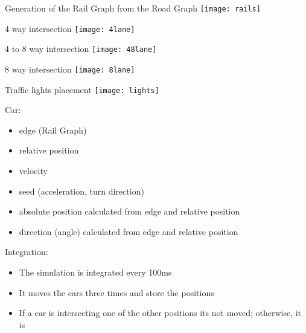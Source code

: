 \documentclass{beamer}
\begin{document}
\begin{frame}
	\begin{center}
	Generation of the Rail Graph from the Road Graph	
	\texttt{[image: rails]}
	\end{center}
\end{frame}

\begin{frame}
	\begin{center}
	4 way intersection	
	\texttt{[image: 4lane]}
	\end{center}
\end{frame}

\begin{frame}
	\begin{center}
	4 to 8 way intersection	
	\texttt{[image: 48lane]}
	\end{center}
\end{frame}

\begin{frame}
	\begin{center}
	8 way intersection	
	\texttt{[image: 8lane]}
	\end{center}
\end{frame}

\begin{frame}
	\begin{center}
	Traffic lights placement
	\texttt{[image: lights]}
	\end{center}
\end{frame}

\begin{frame}
Car:
\begin{itemize}
	\item edge (Rail Graph)
	\item relative position
	\item velocity
	\item seed (acceleration, turn direction)
	\item absolute position calculated from edge and relative position
	\item direction (angle) calculated from edge and relative position
\end{itemize}
\end{frame}

\begin{frame}
Integration:
\begin{itemize}
	\item The simulation is integrated every 100ms
	\item It moves the cars three times and store the positions
	\item If a car is intersecting one of the other positions its not moved; otherwise, it is
\end{itemize}
\end{frame}
\end{document}
